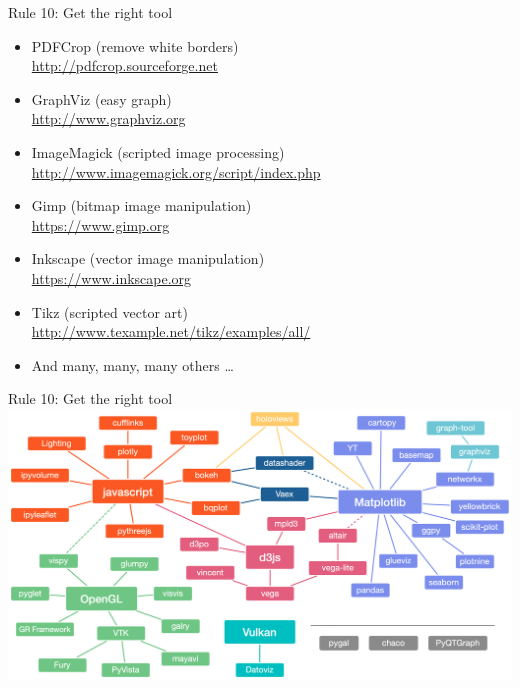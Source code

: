 \documentclass[10pt,aspectratio=169]{beamer}
\begin{document}
\begin{frame}{Rule 10: Get the right tool}
  \begin{itemize}
  \item PDFCrop (remove white borders)\\
    \url{http://pdfcrop.sourceforge.net}
  \item GraphViz (easy graph)\\
    \url{http://www.graphviz.org}
  \item ImageMagick (scripted image processing)\\
    \url{http://www.imagemagick.org/script/index.php}
  \item Gimp (bitmap image manipulation)\\
    \url{https://www.gimp.org}
  \item Inkscape (vector image manipulation)\\
    \url{https://www.inkscape.org}
  \item Tikz (scripted vector art)\\
    \url{http://www.texample.net/tikz/examples/all/}
  \item And many, many, many others …
  \end{itemize}
\end{frame}

\begin{frame}{Rule 10: Get the right tool}
    \includegraphics[width=\textwidth]{visualization-landscape.png}
\end{frame}
\end{document}
